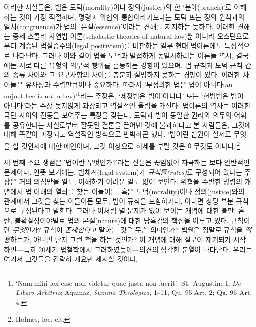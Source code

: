 \documentclass[12pt, oneside]{book}  %
\begin{document}
이러한 사실들은, 법은 도덕(morality)이나 정의(justice)의 한
`분야(branch)'로 이해하는 것이 가장 적절하며, 명령과 위협의
통합이라기보다는 도덕 또는 정의 원칙과의 일치(congruence)가 법의
'본질(essence)'이라는 견해를 지지하는 듯하다. 이러한 견해는 중세 스콜라
자연법 이론(scholastic theories of natural law)뿐 아니라 오스틴으로부터
계승된 법실증주의(legal positivism)를 비판하는 일부 현대 법이론에도
특징적으로 나타난다. 그러나 이와 같이 법을 도덕과 밀접하게 동일시하려는
이론들 역시, 결국에는 서로 다른 유형의 의무적 행위를 혼동하는 경향이
있으며, 법 규칙과 도덕 규칙 간의 종류 차이와 그 요구사항의 차이를 충분히
설명하지 못하는 경향이 있다. 이러한 차이들은 유사성과 수렴만큼이나
중요하다. 따라서 '부정의한 법은 법이 아니다(an unjust law is not a
law)'\footnote{`Nam mihi lex esse non videtur quae justa non fuerit':
  St.~Augustine I, \emph{De Libero Arbitrio}; Aquinas, \emph{Summa
  Theologica}, 1--11, Qu. 95 Art. 2; Qu. 96 Art. 4.}라는 주장은,
`제정법은 법이 아니다' 또는 `헌법법은 법이 아니다'라는 주장 못지않게
과장되고 역설적인 울림을 가진다. 법이론의 역사는 이러한 극단 사이의
진동을 보여주는 특징을 갖는다. 도덕과 법이 동일한 권리와 의무의 어휘를
공유한다는 사실로부터 잘못된 결론을 끌어낸 것에 불과하다고 본 사람들은,
그것에 대해 똑같이 과장되고 역설적인 방식으로 반박하곤 했다. '법이란
법원이 실제로 무엇을 할 것인지에 대한 예언이며, 그것 이상으로 허세를
부릴 것은 아무것도 아니다.'\footnote{Holmes, loc. cit.}

세 번째 주요 쟁점은 '법이란 무엇인가?'라는 질문을 끊임없이 자극하는 보다
일반적인 문제이다. 언뜻 보기에는, 법체계(legal system)가
\emph{규칙들(rules)}로 구성되어 있다는 주장은 거의 의심받을 일도,
이해하기 어려운 일도 없어 보인다. 위협을 수반한 명령의 개념에서 법
이해의 열쇠를 찾는 이들이든, 혹은 도덕(morality)이나 정의(justice)와의
관계에서 그것을 찾는 이들이든 모두, 법이 규칙을 포함하거나, 아니면 상당
부분 규칙으로 구성된다고 말한다. 그러나 이처럼 별 문제가 없어 보이는
개념에 대한 불만, 혼란, 불확실성이야말로 법의 본질(nature)에 대한
당혹감의 핵심을 이루고 있다. 규칙이란 \emph{무엇}인가? 규칙이
\emph{존재한다}고 말하는 것은 무슨 의미인가? 법원은 정말로 규칙을
\emph{적용}하는가, 아니면 단지 그런 척을 하는 것인가? 이 개념에 대해
질문이 제기되기 시작하면---특히 20세기 법철학에서 그러하였듯이---의견의
심각한 분열이 나타난다. 우리는 여기서 그것들을 간략히 개요만 제시할
것이다.
\end{document}
